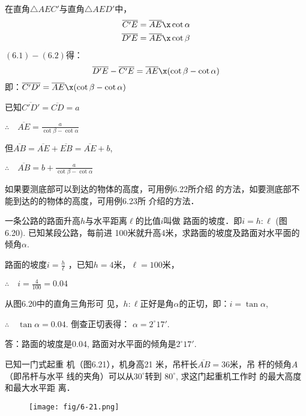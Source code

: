 \begin{solution}
    在直角$\triangle AEC'$与直角$\triangle AED'$中，
\begin{align}
    \overline{C'E}&=\overline{AE}\x \cot\alpha\\
    \overline{D'E}&=\overline{AE}\x \cot\beta
\end{align}
$(6.1)-(6.2)$得：
\[\overline{D'E}-\overline{C'E}=\overline{AE} \x(\cot\beta-\cot\alpha)\]
即：$\overline{C'D'}=\overline{AE} \x(\cot\beta-\cot\alpha)$

已知$\overline{C'D'}=\overline{CD}=a$

$\therefore\quad \overline{AE}=\frac{a}{\cot\beta-\cot\alpha}$

但$\overline{AB}=\overline{AE}+\overline{EB}=\overline{AE} +b$, 

$\therefore\quad \overline{AB}=b+\frac{a}{\cot\beta-\cot\alpha}$

\end{solution}

如果要测底部可以到达的物体的高度，可用例6.22所介绍
的方法，如要测底部不能到达的的物体的高度，可用例6.23所
介绍的方法．

\begin{example}
    一条公路的路面升高$h$与水平距离$\ell$的比值$i$叫做
    路面的坡度．即$i=h:\ell$ (图6.20). 已知某段公路，每前进
    100米就升高4米，求路面的坡度及路面对水平面的倾角$\alpha$.
\end{example}

\begin{solution}
    路面的坡度$i=\frac{h}{\ell}$
    ，已知$h=4$米，$\ell=100$米，

$\therefore\quad  i=\frac{4}{100}=0.04$

    从图6.20中的直角三角形可
    见，$h:\ell$正好是角$\alpha$的正切，即：$i=\tan\alpha$,
    
    $\therefore\quad \tan\alpha=0.04$. 倒查正切表得：
    $\alpha=2^{\circ}17'$.

    答：路面的坡度是0.04, 路面对水平面的倾角是$2^{\circ}17'$.
\end{solution}

\begin{example}
   已知一门式起重
机（图6.21），机身高21
米，吊杆长$\overline{AB}=36$米，吊
杆的倾角$A$（即吊杆与水平
线的夹角）可以从$30^{\circ}$转到
$80^{\circ}$, 求这门起重机工作时
的最大高度和最大水平距
离．
\end{example}
    
\begin{figure}[htp]
    \centering
\texttt{[image: fig/6-21.png]}
    \caption{}
\end{figure}

